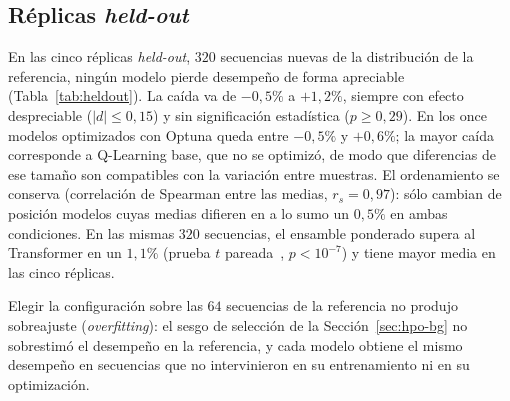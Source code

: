 \documentclass[../00_Main/Main.tex]{subfiles}
\begin{document}
\subsection{R\'eplicas \emph{held-out}}\label{sec:res-heldout}

En las cinco r\'eplicas \emph{held-out}, $320$ secuencias nuevas de la
distribuci\'on de la referencia, ning\'un modelo pierde desempe\~no de
forma apreciable (Tabla~\ref{tab:heldout}). La ca\'ida va de $-0{,}5\%$ a $+1{,}2\%$, siempre con efecto despreciable
($|d| \le 0{,}15$) y sin significaci\'on estad\'istica ($p \ge 0{,}29$). En los once
modelos optimizados con Optuna queda entre $-0{,}5\%$ y $+0{,}6\%$; la
mayor ca\'ida corresponde a Q-Learning base, que no se optimiz\'o, de modo que
diferencias de ese tama\~no son compatibles con la variaci\'on entre
muestras. El ordenamiento se conserva (correlaci\'on de Spearman entre
las medias, $r_s = 0{,}97$): s\'olo cambian de posici\'on modelos cuyas
medias difieren en a lo sumo un $0{,}5\%$ en ambas condiciones. En las
mismas $320$ secuencias, el ensamble ponderado supera al Transformer en un
$1{,}1\%$ (prueba $t$ pareada~\citep{Student1908}, $p < 10^{-7}$) y tiene
mayor media en las cinco r\'eplicas.

Elegir la configuraci\'on sobre las $64$ secuencias de la referencia no
produjo sobreajuste (\emph{overfitting}): el sesgo de
selecci\'on de la Secci\'on~\ref{sec:hpo-bg} no sobrestim\'o el desempe\~no en la referencia, y cada modelo obtiene el mismo desempe\~no en secuencias que no
intervinieron en su entrenamiento ni en su optimizaci\'on.
\end{document}
